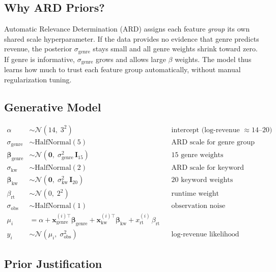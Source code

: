 \documentclass[12pt,a4paper]{article}
\begin{document}
\subsection{Why ARD Priors?}

Automatic Relevance Determination (ARD) assigns each feature \emph{group}
its own shared scale hyperparameter. If the data provides no evidence that
genre predicts revenue, the posterior $\sigma_\text{genre}$ stays small
and all genre weights shrink toward zero. If genre is informative,
$\sigma_\text{genre}$ grows and allows large $\beta$ weights.
The model thus learns how much to trust each feature group automatically,
without manual regularization tuning.

\subsection{Generative Model}

\begin{align}
  \alpha &\sim \mathcal{N}(14,\; 3^2)
    && \text{intercept (log-revenue $\approx 14$--$20$)} \\[4pt]
  \sigma_\text{genre} &\sim \text{HalfNormal}(5)
    && \text{ARD scale for genre group} \\
  \boldsymbol{\beta}_\text{genre} &\sim \mathcal{N}\!\left(
      \mathbf{0},\; \sigma_\text{genre}^2\,\mathbf{I}_{15}
    \right)
    && \text{15 genre weights} \\[4pt]
  \sigma_\text{kw} &\sim \text{HalfNormal}(2)
    && \text{ARD scale for keyword group} \\
  \boldsymbol{\beta}_\text{kw} &\sim \mathcal{N}\!\left(
      \mathbf{0},\; \sigma_\text{kw}^2\,\mathbf{I}_{20}
    \right)
    && \text{20 keyword weights} \\[4pt]
  \beta_\text{rt} &\sim \mathcal{N}(0,\; 2^2)
    && \text{runtime weight} \\[4pt]
  \sigma_\text{obs} &\sim \text{HalfNormal}(1)
    && \text{observation noise} \\[8pt]
  \mu_i &= \alpha
    + \mathbf{x}_{\text{genre}}^{(i)\top}\boldsymbol{\beta}_\text{genre}
    + \mathbf{x}_{\text{kw}}^{(i)\top}\boldsymbol{\beta}_\text{kw}
    + x_{\text{rt}}^{(i)}\,\beta_\text{rt} \\[4pt]
  y_i &\sim \mathcal{N}(\mu_i,\; \sigma_\text{obs}^2)
    && \text{log-revenue likelihood}
\end{align}

\subsection{Prior Justification}
\end{document}
